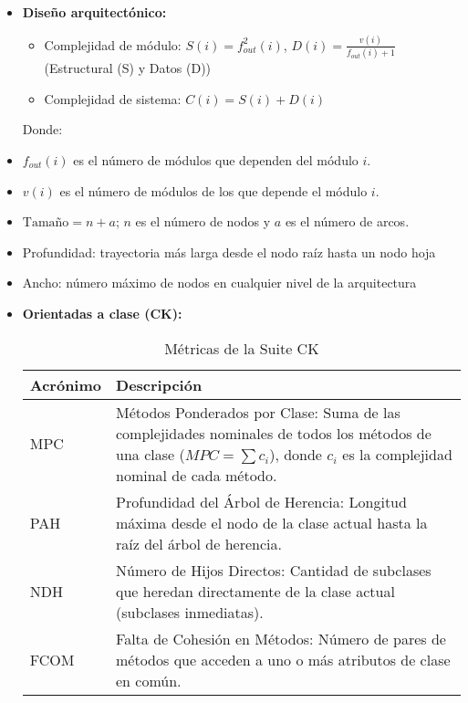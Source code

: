 \begin{itemize}
        \item \textbf{Diseño arquitectónico:}
        \begin{itemize}
            \item Complejidad de módulo: $S(i) = f^2_{out}(i)$, $D(i) = \frac{v(i)}{f_{out}(i) + 1}$ (Estructural (S) y Datos (D))
            \item Complejidad de sistema: $C(i) = S(i) + D(i)$
        \end{itemize}
        Donde:
        \item $f_{out}(i)$ es el número de módulos que dependen del módulo $i$.
        \item $v(i)$ es el número de módulos de los que depende el módulo $i$.
        \item $\text{Tamaño} = n + a$; $n$ es el número de nodos y $a$ es el número de arcos.
        \item Profundidad: trayectoria más larga desde el nodo raíz hasta un nodo hoja
        \item Ancho: número máximo de nodos en cualquier nivel de la arquitectura

        \item \textbf{Orientadas a clase (CK):}
        \begin{table}[!ht]
            \centering
            \caption{Métricas de la Suite CK}
            \label{tab:ck_metrics}
            \begin{tabularx}{\linewidth}{lX}
                \toprule
                \textbf{Acrónimo} & \textbf{Descripción}                                                                                                                                                          \\
                \midrule
                MPC               & Métodos Ponderados por Clase: Suma de las complejidades nominales de todos los métodos de una clase ($MPC = \sum c_i$), donde $c_i$ es la complejidad nominal de cada método. \\
                \addlinespace[0.3cm]
                PAH               & Profundidad del Árbol de Herencia: Longitud máxima desde el nodo de la clase actual hasta la raíz del árbol de herencia.                                                      \\
                \addlinespace[0.3cm]
                NDH               & Número de Hijos Directos: Cantidad de subclases que heredan directamente de la clase actual (subclases inmediatas).                                                           \\
                \addlinespace[0.3cm]
                FCOM              & Falta de Cohesión en Métodos: Número de pares de métodos que acceden a uno o más atributos de clase en común.                                                                 \\
                \bottomrule
            \end{tabularx}
        \end{table}


\end{itemize}
